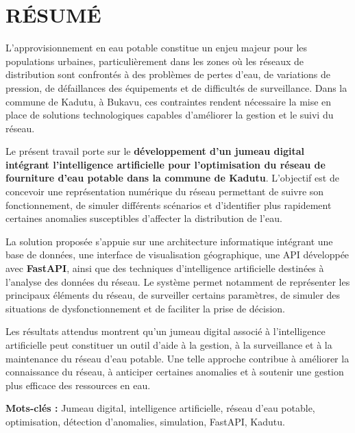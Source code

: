 \cleardoublepage
\chapter*{RÉSUMÉ}

L'approvisionnement en eau potable constitue un enjeu majeur
pour les populations urbaines, particulièrement dans les zones
où les réseaux de distribution sont confrontés à des problèmes
de pertes d'eau, de variations de pression, de défaillances des
équipements et de difficultés de surveillance. Dans la commune
de Kadutu, à Bukavu, ces contraintes rendent nécessaire la mise
en place de solutions technologiques capables d'améliorer la
gestion et le suivi du réseau.

Le présent travail porte sur le \textbf{développement d'un
	jumeau digital intégrant l'intelligence artificielle pour
	l'optimisation du réseau de fourniture d'eau potable dans la
	commune de Kadutu}. L'objectif est de concevoir une représentation
numérique du réseau permettant de suivre son fonctionnement,
de simuler différents scénarios et d'identifier plus rapidement
certaines anomalies susceptibles d'affecter la distribution
de l'eau.

La solution proposée s'appuie sur une architecture informatique
intégrant une base de données, une interface de visualisation
géographique, une API développée avec \textbf{FastAPI}, ainsi
que des techniques d'intelligence artificielle destinées à
l'analyse des données du réseau. Le système permet notamment
de représenter les principaux éléments du réseau, de surveiller
certains paramètres, de simuler des situations de dysfonctionnement
et de faciliter la prise de décision.

Les résultats attendus montrent qu'un jumeau digital associé
à l'intelligence artificielle peut constituer un outil d'aide
à la gestion, à la surveillance et à la maintenance du réseau
d'eau potable. Une telle approche contribue à améliorer la
connaissance du réseau, à anticiper certaines anomalies et à
soutenir une gestion plus efficace des ressources en eau.

\vspace{0.5cm}

\noindent\textbf{Mots-clés :} Jumeau digital, intelligence
artificielle, réseau d'eau potable, optimisation, détection
d'anomalies, simulation, FastAPI, Kadutu.

\cleardoublepage